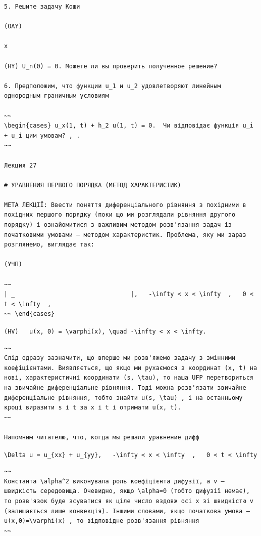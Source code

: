 \documentclass[
  ukrainian,
]{article}
\begin{document}
\begin{verbatim}
5. Решите задачу Коши

(OAY)

x

(HY) U_n(0) = 0. Можете ли вы проверить полученное решение?

6. Предположим, что функции u_1 и u_2 удовлетворяют линейным однородным граничным условиям

~~
\begin{cases} u_x(1, t) + h_2 u(1, t) = 0.  Чи відповідає функція u_i + u_i цим умовам? , .
~~

Лекция 27

# УРАВНЕНИЯ ПЕРВОГО ПОРЯДКА (МЕТОД ХАРАКТЕРИСТИК)

МЕТА ЛЕКЦІЇ: Ввести поняття диференціального рівняння з похідними в похідних першого порядку (поки що ми розглядали рівняння другого порядку) і ознайомитися з важливим методом розв'язання задач із початковими умовами — методом характеристик. Проблема, яку ми зараз розглянемо, виглядає так:

(УЧП)

~~
| _                                |,   -\infty < x < \infty  ,   0 < t < \infty  ,
~~ \end{cases}
\end{verbatim}

\texttt{(HV)\ \ \ u(x,\ 0)\ =\ \textbackslash{}varphi(x),\ \textbackslash{}quad\ -\textbackslash{}infty\ \textless{}\ x\ \textless{}\ \textbackslash{}infty.}

\begin{verbatim}
~~
Слід одразу зазначити, що вперше ми розв'яжемо задачу з змінними коефіцієнтами. Виявляється, що якщо ми рухаємося з координат (x, t) на нові, характеристичні координати (s, \tau), то наша UFP перетвориться на звичайне диференціальне рівняння. Тоді можна розв'язати звичайне диференціальне рівняння, тобто знайти u(s, \tau) , і на останньому кроці виразити s і t за x і t і отримати u(x, t).
~~

Напомним читателю, что, когда мы решали уравнение дифф
\end{verbatim}

\texttt{\textbackslash{}Delta\ u\ =\ u\_\{xx\}\ +\ u\_\{yy\},\ \ \ -\textbackslash{}infty\ \textless{}\ x\ \textless{}\ \textbackslash{}infty\ \ ,\ \ \ 0\ \textless{}\ t\ \textless{}\ \textbackslash{}infty}

\begin{verbatim}
~~
Константа \alpha^2 виконувала роль коефіцієнта дифузії, а v — швидкість середовища. Очевидно, якщо \alpha=0 (тобто дифузії немає), то розв'язок буде зсуватися як ціле число вздовж осі x зі швидкістю v (залишається лише конвекція). Іншими словами, якщо початкова умова — u(x,0)=\varphi(x) , то відповідне розв'язання рівняння
~~
\end{verbatim}
\end{document}
